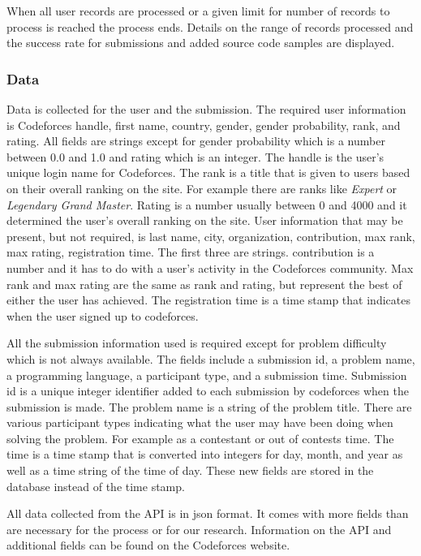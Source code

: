 \documentclass[12pt]{article}
\begin{document}
When all user records are processed or a given limit for number of records to process is reached the process ends. Details on the range of records processed and the success rate for submissions and added source code samples are displayed.

\subsubsection*{Data}
Data is collected for the user and the submission. The required user information is Codeforces handle, first name, country, gender, gender probability, rank, and rating. All fields are strings except for gender probability which is a number between 0.0 and 1.0 and rating which is an integer. The handle is the user's unique login name for Codeforces. The rank is a title that is given to users based on their overall ranking on the site. For example there are ranks like \textit{Expert} or \textit{Legendary Grand Master}. Rating is a number usually between 0 and 4000 and it determined the user's overall ranking on the site. User information that may be present, but not required, is last name, city, organization, contribution, max rank, max rating, registration time. The first three are strings. contribution is a number and it has to do with a user's activity in the Codeforces community. Max rank and max rating are the same as rank and rating, but represent the best of either the user has achieved. The registration time is a time stamp that indicates when the user signed up to codeforces.

All the submission information used is required except for problem difficulty which is not always available. The fields include a submission id, a problem name, a programming language, a participant type, and a submission time. Submission id is a unique integer identifier added to each submission by codeforces when the submission is made. The problem name is a string of the problem title. There are various participant types indicating what the user may have been doing when solving the problem. For example as a contestant or out of contests time. The time is a time stamp that is converted into integers for day, month, and year as well as a time string of the time of day. These new fields are stored in the database instead of the time stamp.

All data collected from the API is in json format. It comes with more fields than are necessary for the process or for our research. Information on the API and additional fields can be found on the Codeforces website.
\end{document}
